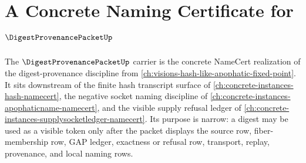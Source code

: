 \chapter{A Concrete Naming Certificate for $\DigestProvenancePacketUp$}
\label{ch:concrete-instances-digestprovenancepacket-namecert}

The $\DigestProvenancePacketUp$ carrier is the concrete NameCert realization of the digest-provenance discipline from \autoref{ch:visions-hash-like-apophatic-fixed-point}. It sits downstream of the finite hash transcript surface of \autoref{ch:concrete-instances-hash-namecert}, the negative socket naming discipline of \autoref{ch:concrete-instances-apophaticname-namecert}, and the visible supply refusal ledger of \autoref{ch:concrete-instances-supplysocketledger-namecert}. Its purpose is narrow: a digest may be used as a visible token only after the packet displays the source row, fiber-membership row, GAP ledger, exactness or refusal row, transport, replay, provenance, and local naming rows.



